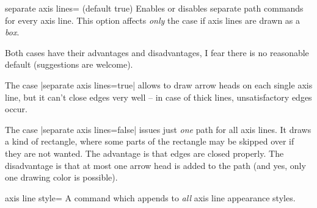 \begin{pgfplotskey}{separate axis lines= (default true)}
	Enables or disables separate path commands for every axis line. This option affects \emph{only} the case if axis lines are drawn as a \emph{box}.

	Both cases have their advantages and disadvantages, I fear there is no reasonable default (suggestions are welcome).

	The case |separate axis lines=true| allows to draw arrow heads on each single axis line, but it can't close edges very well -- in case of thick lines, unsatisfactory edges occur.
\begin{codeexample}[]
\end{codeexample}

	The case |separate axis lines=false| issues just \emph{one} path for all axis lines. It draws a kind of rectangle, where some parts of the rectangle may be skipped over if they are not wanted. The advantage is that edges are closed properly. The disadvantage is that at most one arrow head is added to the path (and yes, only one drawing color is possible).
\begin{codeexample}[]
\end{codeexample}
\end{pgfplotskey}


\label{pgfplots:page:axislines}
\begin{pgfplotskey}{axis line style=}
	A command which appends  to \emph{all} axis line appearance styles.
\end{pgfplotskey}

